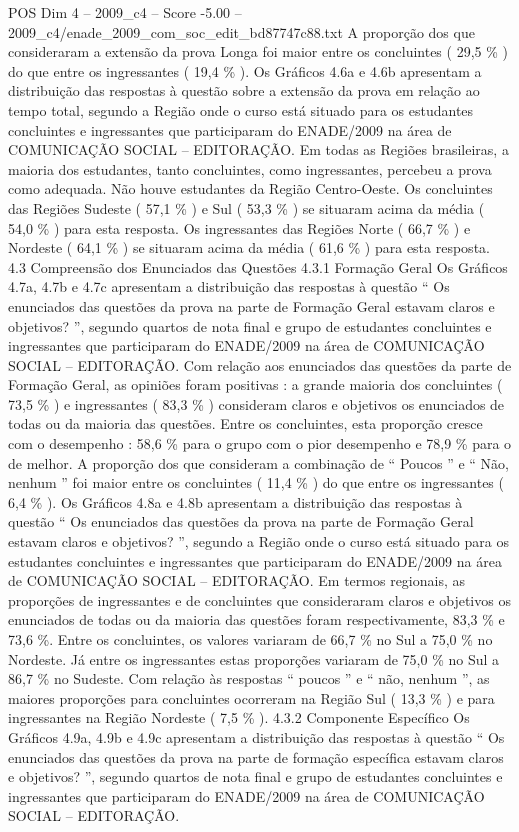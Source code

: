\begin{textsample}{POS Dim 4 – 2009\_c4 – Score -5.00 – 2009\_c4/enade\_2009\_com\_soc\_edit\_bd87747c88.txt}
A proporção dos que consideraram a extensão da prova Longa foi maior entre os concluintes ( 29,5 \% ) do que entre os ingressantes ( 19,4 \% ).
Os Gráficos 4.6a e 4.6b apresentam a distribuição das respostas à questão sobre a extensão da prova em relação ao tempo total, segundo a Região onde o curso está situado para os estudantes concluintes e ingressantes que participaram do ENADE/2009 na área de COMUNICAÇÃO SOCIAL – EDITORAÇÃO.
Em todas as Regiões brasileiras, a maioria dos estudantes, tanto concluintes, como ingressantes, percebeu a prova como adequada.
Não houve estudantes da Região Centro-Oeste.
Os concluintes das Regiões Sudeste ( 57,1 \% ) e Sul ( 53,3 \% ) se situaram acima da média ( 54,0 \% ) para esta resposta.
Os ingressantes das Regiões Norte ( 66,7 \% ) e Nordeste ( 64,1 \% ) se situaram acima da média ( 61,6 \% ) para esta resposta. 4.3 Compreensão dos Enunciados das Questões 4.3.1 Formação Geral Os Gráficos 4.7a, 4.7b e 4.7c apresentam a distribuição das respostas à questão “ Os enunciados das questões da prova na parte de Formação Geral estavam claros e objetivos? ”, segundo quartos de nota final e grupo de estudantes concluintes e ingressantes que participaram do ENADE/2009 na área de COMUNICAÇÃO SOCIAL – EDITORAÇÃO.
Com relação aos enunciados das questões da parte de Formação Geral, as opiniões foram positivas : a grande maioria dos concluintes ( 73,5 \% ) e ingressantes ( 83,3 \% ) consideram claros e objetivos os enunciados de todas ou da maioria das questões.
Entre os concluintes, esta proporção cresce com o desempenho : 58,6 \% para o grupo com o pior desempenho e 78,9 \% para o de melhor.
A proporção dos que consideram a combinação de “ Poucos ” e “ Não, nenhum ” foi maior entre os concluintes ( 11,4 \% ) do que entre os ingressantes ( 6,4 \% ).
Os Gráficos 4.8a e 4.8b apresentam a distribuição das respostas à questão “ Os enunciados das questões da prova na parte de Formação Geral estavam claros e objetivos? ”, segundo a Região onde o curso está situado para os estudantes concluintes e ingressantes que participaram do ENADE/2009 na área de COMUNICAÇÃO SOCIAL – EDITORAÇÃO.
Em termos regionais, as proporções de ingressantes e de concluintes que consideraram claros e objetivos os enunciados de todas ou da maioria das questões foram respectivamente, 83,3 \% e 73,6 \%.
Entre os concluintes, os valores variaram de 66,7 \% no Sul a 75,0 \% no Nordeste.
Já entre os ingressantes estas proporções variaram de 75,0 \% no Sul a 86,7 \% no Sudeste.
Com relação às respostas “ poucos ” e “ não, nenhum ”, as maiores proporções para concluintes ocorreram na Região Sul ( 13,3 \% ) e para ingressantes na Região Nordeste ( 7,5 \% ). 4.3.2 Componente Específico Os Gráficos 4.9a, 4.9b e 4.9c apresentam a distribuição das respostas à questão “ Os enunciados das questões da prova na parte de formação específica estavam claros e objetivos? ”, segundo quartos de nota final e grupo de estudantes concluintes e ingressantes que participaram do ENADE/2009 na área de COMUNICAÇÃO SOCIAL – EDITORAÇÃO.

\end{textsample}
